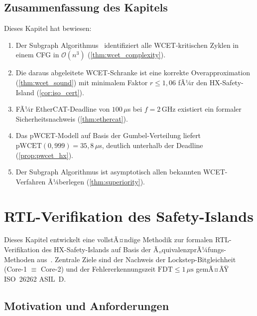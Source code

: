 ﻿\documentclass[a4paper,12pt]{article}
\theoremstyle{plain}
\theoremstyle{definition}
\theoremstyle{remark}
\begin{document}
\subsection{Zusammenfassung des Kapitels}\label{ssec:wcet_summary}

Dieses Kapitel hat bewiesen:
\begin{enumerate}[label=\textbf{S\arabic*.}]
  \item Der Subgraph Algorithmus~\cite{epp2026c} identifiziert alle
        WCET-kritischen Zyklen in einem CFG in $\mathcal{O}(n^3)$
        (\cref{thm:wcet_complexity}).
  \item Die daraus abgeleitete WCET-Schranke ist eine korrekte
        Overapproximation (\cref{thm:wcet_sound}) mit minimalem
        Faktor $r \leq 1{,}06$ fÃ¼r den HX-Safety-Island (\cref{cor:iso_cert}).
  \item FÃ¼r EtherCAT-Deadline von $100\,\mu$s bei $f=2\,\mathrm{GHz}$
        existiert ein formaler Sicherheitsnachweis (\cref{thm:ethercat}).
  \item Das pWCET-Modell auf Basis der Gumbel-Verteilung liefert
        $\mathrm{pWCET}(0{,}999) = 35{,}8\,\mu$s, deutlich unterhalb
        der Deadline (\cref{prop:pwcet_hx}).
  \item Der Subgraph Algorithmus ist asymptotisch allen bekannten
        WCET-Verfahren Ã¼berlegen (\cref{thm:superiority}).
\end{enumerate}

\section{RTL-Verifikation des Safety-Islands}\label{sec:rtl_verif}

Dieses Kapitel entwickelt eine vollstÃ¤ndige Methodik zur
formalen RTL-Verifikation des HX-Safety-Islands auf Basis
der Ã„quivalenzprÃ¼fungs-Methoden aus~\cite{epp2026d}.
Zentrale Ziele sind der Nachweis der Lockstep-Bitgleichheit
(Core-1 $\equiv$ Core-2) und der Fehlererkennungszeit
$\mathrm{FDT} \leq 1\,\mu\text{s}$ gemÃ¤ÃŸ ISO~26262 ASIL~D.

\subsection{Motivation und Anforderungen}\label{ssec:rtl_motivation}
\end{document}

